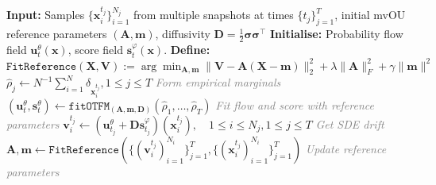 \documentclass{article}
\renewcommand{\Comment}[1]{\hfill\textcolor{gray}{\textit{#1}}}
\theoremstyle{newstyle}
\begin{document}
\begin{algorithm}[t!]
  \small
  \caption{Iterated reference fitting with mvOU-OTFM}
  \begin{algorithmic}
    \State \textbf{Input:} Samples $\{ \bm{x}_i^{t_j} \}_{i = 1}^{N_j}$ from multiple snapshots at times $\{ t_j \}_{j = 1}^T$, initial mvOU reference parameters $(\bm{A}, \bm{m})$, diffusivity $\bm{D} = \frac{1}{2}\bm{\sigma}\bm{\sigma}^\top$ \nonumber
    \State \textbf{Initialise:} Probability flow field $\bm{u}^\theta_t(\bm{x})$, score field $\bm{s}^\varphi_t(\bm{x})$.
    \State \textbf{Define:} $\texttt{FitReference}(\bm{X}, \bm{V}) := \arg\min_{\bm{A}, \bm{m}} \| \bm{V} - \bm{A}(\bm{X} - \bm{m}) \|_2^2 + \lambda \| \bm{A} \|_F^2 + \gamma \| \bm{m} \|^2$ 
    \State $\hat{\rho}_j \gets N^{-1} \sum_{i = 1}^N \delta_{\bm{x}_i^{t_j}}, 1 \leq j \leq T$ \Comment{Form empirical marginals}
      \State $(\bm{u}_t^\theta, \bm{s}_t^\theta) \gets \texttt{fitOTFM}_{(\bm{A}, \bm{m}, \bm{D})}(\hat{\rho}_1, \ldots, \hat{\rho}_T)$ \Comment{Fit flow and score with reference parameters}
      \State $\bm{v}_i^{t_j} \gets (\bm{u}_{t_j}^\theta + \bm{D} \bm{s}_{t_j}^\varphi)(\bm{x}_i^{t_j}), \quad 1 \leq i \leq N_j, 1 \leq j \leq T$ \Comment{Get SDE drift}
      \State $\bm{A}, \bm{m} \gets \texttt{FitReference}(\{ (\bm{v}_i^{t_j})_{i=1}^{N_i} \}_{j = 1}^T, \{ (\bm{x}_i^{t_j})_{i=1}^{N_i} \}_{j = 1}^T)$ \Comment{Update reference parameters}
    \EndWhile
  \end{algorithmic}
  \label{alg:mvOU_OTFM_iterated}
\end{algorithm}
\end{document}

